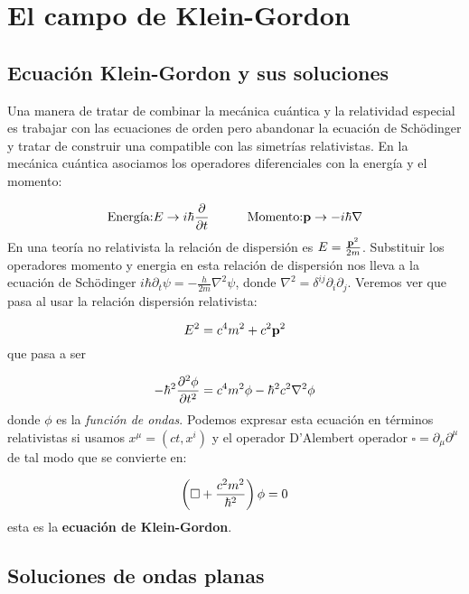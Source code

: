 \chapter{El campo de Klein-Gordon}

\section{Ecuación Klein-Gordon y sus soluciones}

Una manera de tratar de combinar la mecánica cuántica y la relatividad especial es trabajar con las ecuaciones de orden pero abandonar la ecuación de Schödinger y tratar de construir una compatible con las simetrías relativistas. En la mecánica cuántica asociamos los operadores diferenciales con la energía y el momento:

\begin{equation}
    \text{Energía:} E \rightarrow i \hbar \frac{\partial }{\partial t} \quad \quad \quad \text{Momento:} \mathbf{p} \rightarrow - i \hbar \nabla
\end{equation}
En una teoría no relativista la relación de dispersión es $E=\frac{\mathbf{p}^2}{2m}$. Substituir los operadores momento y energia en esta relación de dispersión nos lleva a la ecuación de Schödinger $i \hbar \partial_t \psi = - \frac{h}{2m} \nabla^2 \psi$, donde $\nabla^2 = \delta^{ij} \partial_i \partial_j$. Veremos ver que pasa al usar la relación dispersión relativista: 

\begin{equation}
    E^2 = c^4 m^2 + c^2 \mathbf{p}^2
\end{equation}
que pasa a ser

\begin{equation}
    - \hbar^2 \frac{\partial ^2 \phi}{\partial t^2} = c^4 m^2 \phi - \hbar^2 c^2 \nabla^2 \phi
\end{equation}
donde $\phi$ es la \textit{función de ondas}. Podemos expresar esta ecuación en términos relativistas si usamos $x^{\mu} = (ct,x^i)$ y el operador D'Alembert operador $\square = \partial_\mu \partial^\mu$ de tal modo que se convierte en:

\begin{equation}
    \left( \square + \frac{c^2 m^2}{\hbar^2} \right) \phi = 0 \label{Ec:02-1-4-KleinGordon}
\end{equation}
esta es la {\bf ecuación de Klein-Gordon}. 

\section{Soluciones de ondas planas}

